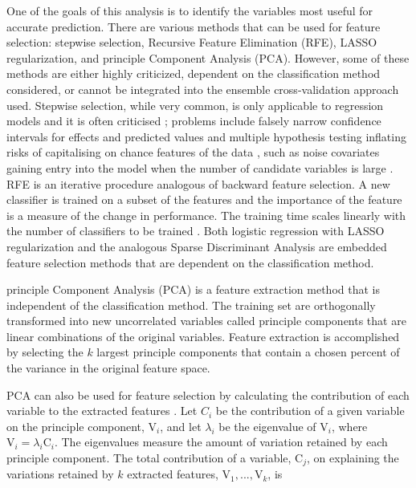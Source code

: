 \documentclass[12pt,]{article}
\begin{document}
One of the goals of this analysis is to identify the variables most
useful for accurate prediction. There are various methods that can be
used for feature selection: stepwise selection, Recursive Feature
Elimination (RFE), LASSO regularization, and principle Component
Analysis (PCA). However, some of these methods are either highly
criticized, dependent on the classification method considered, or cannot
be integrated into the ensemble cross-validation approach used. Stepwise
selection, while very common, is only applicable to regression models
and it is often criticised \autocite{kemp_applied_2003}; problems
include falsely narrow confidence intervals for effects and predicted
values \autocite{altman_bootstrap_1989} and multiple hypothesis testing
inflating risks of capitalising on chance features of the data
\autocite{altman_practical_1991}, such as noise covariates gaining entry
into the model when the number of candidate variables is large
\autocite{derksen_backward_1992}. RFE is an iterative procedure
analogous of backward feature selection. A new classifier is trained on
a subset of the features and the importance of the feature is a measure
of the change in performance. The training time scales linearly with the
number of classifiers to be trained \autocite{guyon_gene_2002}. Both
logistic regression with LASSO regularization
\autocite{tibshirani_regression_1996} and the analogous Sparse
Discriminant Analysis \autocite{clemmensen_sparse_2011} are embedded
feature selection methods that are dependent on the classification
method.

principle Component Analysis (PCA) \autocite{f.r.s_liii._1901} is a
feature extraction method that is independent of the classification
method. The training set are orthogonally transformed into new
uncorrelated variables called principle components that are linear
combinations of the original variables. Feature extraction is
accomplished by selecting the \(k\) largest principle components that
contain a chosen percent of the variance in the original feature space.

PCA can also be used for feature selection by calculating the
contribution of each variable to the extracted features
\autocite{song_feature_2010}. Let \(C_i\) be the contribution of a given
variable on the principle component, \(\text{V}_i\), and let
\(\lambda_i\) be the eigenvalue of \(\text{V}_i\), where
\(\text{V}_{i} = \lambda_i \text{C}_i\). The eigenvalues measure the
amount of variation retained by each principle component. The total
contribution of a variable, \(\text{C}_j\), on explaining the variations
retained by \(k\) extracted features, \(\text{V}_1, ..., \text{V}_k\),
is
\end{document}
